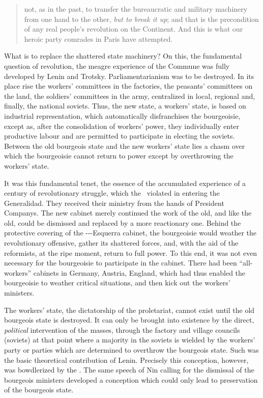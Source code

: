 \begin{quotation}
  \noindent
  not, as in the past, to transfer the bureaucratic and military machinery from one hand to the other, \emph{but to break it up}; and that is the precondition of any real people’s revolution on the Continent. And this is what our heroic party comrades in Paris have attempted.
\end{quotation}

What is to replace the shattered state machinery? On this, the fundamental question of revolution, the meagre experience of the Commune was fully developed by Lenin and Trotsky. Parliamentarianism was to be destroyed. In its place rise the workers’ committees in the factories, the peasants’ committees on the land, the soldiers’ committees in the army, centralized in local, regional and, finally, the national soviets. Thus, the new state, a workers’ state, is based on industrial representation, which automatically disfranchises the bourgeoisie, except as, after the consolidation of workers’ power, they individually enter productive labour and are permitted to participate in electing the soviets. Between the old bourgeois state and the new workers’ state lies a chasm over which the bourgeoisie cannot return to power except by overthrowing the workers’ state.

It was this fundamental tenet, the essence of the accumulated experience of a century of revolutionary struggle, which the \POUM\ violated in entering the Generalidad. They received their ministry from the hands of President Companys. The new cabinet merely continued the work of the old, and like the old, could be dismissed and replaced by a more reactionary one. Behind the protective covering of the \POUM-\CNT-\PSUC-Esquerra cabinet, the bourgeoisie would weather the revolutionary offensive, gather its shattered forces, and, with the aid of the reformists, at the ripe moment, return to full power. To this end, it was not even necessary for the bourgeoisie to participate in the cabinet. There had been ``all-workers'' cabinets in Germany, Austria, England, which had thus enabled the bourgeoisie to weather critical situations, and then kick out the workers’ ministers.

The workers’ state, the dictatorship of the proletariat, cannot exist until the old bourgeois state is destroyed. It can only be brought into existence by the direct, \emph{political} intervention of the masses, through the factory and village councils (soviets) at that point where a majority in the soviets is wielded by the workers’ party or parties which are determined to overthrow the bourgeois state. Such was the basic theoretical contribution of Lenin. Precisely this conception, however, was bowdlerized by the \POUM. The same speech of Nin calling for the dismissal of the bourgeois ministers developed a conception which could only lead to preservation of the bourgeois state.


